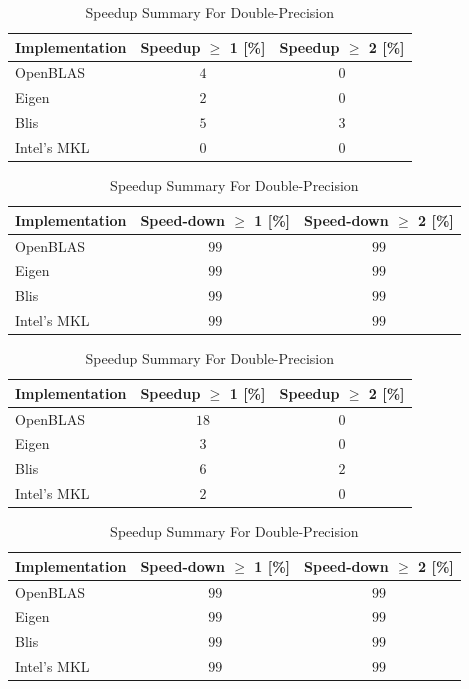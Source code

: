 \begin{table}[ht]
    \centering
    \caption{Speedup Summary For Single-Precision}
    \begin{tabular}{|l|c|c|}
        \hline
        \textbf{Implementation} & \textbf{Speedup $\geq$ 1 [\%]} & \textbf{Speedup $\geq$ 2 [\%]}\\
        \hline
        OpenBLAS    & $4$ & $0$ \\
        \hline
        Eigen       & $2$ & $0$ \\
        \hline
        Blis        & $5$ & $3$ \\
        \hline
        Intel's MKL & $0$ & $0$ \\
        \hline
    \end{tabular}
    
    \begin{tabular}{|l|c|c|}
        \hline
        \textbf{Implementation} & \textbf{Speed-down $\geq$ 1 [\%]} & \textbf{Speed-down $\geq$ 2 [\%]}\\
        \hline
        OpenBLAS    & $99$ & $99$ \\
        \hline
        Eigen       & $99$ & $99$ \\
        \hline
        Blis        & $99$ & $99$ \\
        \hline
        Intel's MKL & $99$ & $99$ \\
        \hline
    \end{tabular}
    
    \vspace*{1 cm}

    \centering
    \caption{Speedup Summary For Double-Precision}
    \begin{tabular}{|l|c|c|}
        \hline
        \textbf{Implementation} & \textbf{Speedup $\geq$ 1 [\%]} & \textbf{Speedup $\geq$ 2 [\%]}\\
        \hline
        OpenBLAS    & $18$ & $0$ \\
        \hline
        Eigen       & $3$ & $0$ \\
        \hline
        Blis        & $6$ & $2$ \\
        \hline
        Intel's MKL & $2$ & $0$ \\
        \hline
    \end{tabular}
    
    \begin{tabular}{|l|c|c|}
        \hline
        \textbf{Implementation} & \textbf{Speed-down $\geq$ 1 [\%]} & \textbf{Speed-down $\geq$ 2 [\%]}\\
        \hline
        OpenBLAS    & $99$ & $99$ \\
        \hline
        Eigen       & $99$ & $99$ \\
        \hline
        Blis        & $99$ & $99$ \\
        \hline
        Intel's MKL & $99$ & $99$ \\
        \hline
    \end{tabular}
\end{table}

